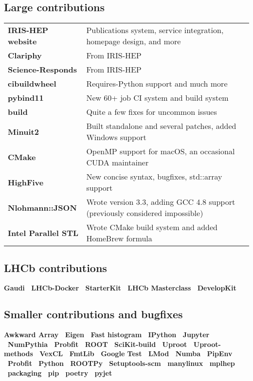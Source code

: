 \documentclass[10pt,letterpaper,english]{moderncv}
\begin{document}
\subsection{Large contributions}
\begin{tabularx}{\textwidth}{>{\bfseries}p{1.4in}X}
	IRIS-HEP website & Publications system, service integration, homepage design, and more \\
	Clariphy         & From IRIS-HEP \\
	Science-Responds & From IRIS-HEP \\
	cibuildwheel   & Requires-Python support and much more \\
	pybind11       & New 60+ job CI system and build system \\
    build          & Quite a few fixes for uncommon issues \\
	Minuit2        & Built standalone and several patches, added Windows support \\
	CMake          & OpenMP support for macOS, an occasional CUDA maintainer  \\
	HighFive       & New concise syntax, bugfixes, std::array support  \\
	Nlohmann::JSON & Wrote version 3.3, adding GCC 4.8 support (previously considered impossible) \\
	Intel Parallel STL & Wrote CMake build system and added HomeBrew formula \\
\end{tabularx}

\subsection{LHCb contributions}
\textbf{%
	Gaudi \bullet\ 
	LHCb-Docker \bullet\ 
	StarterKit \bullet\ 
	LHCb Masterclass \bullet\ 
	DevelopKit
}

\subsection{Smaller contributions and bugfixes}
\textbf{%
	Awkward Array \bullet\ 
	Eigen  \bullet\ 
	Fast histogram \bullet\  
	IPython \bullet\ 
	Jupyter \bullet\ 
	NumPythia \bullet\ 
	Probfit  \bullet\ 
	ROOT \bullet\ 
	SciKit-build \bullet\ 
	Uproot  \bullet\ 
	Uproot-methods \bullet\ 
	VexCL \bullet\ 
    FmtLib \bullet\ 
    Google Test  \bullet\ 
    LMod \bullet\
    Numba \bullet\  
    PipEnv \bullet\ 
    Probfit \bullet\ 
    Python \bullet\ 
    ROOTPy \bullet\ 
    Setuptools-scm \bullet\ 
    manylinux \bullet\ 
    mplhep \bullet\ 
    packaging \bullet\ 
    pip \bullet\ 
    poetry \bullet\ 
    pyjet
}
\end{document}
